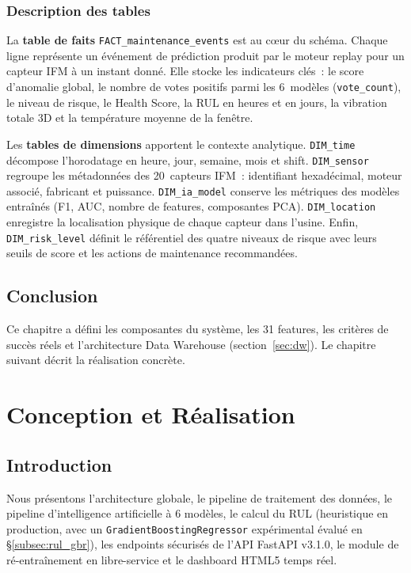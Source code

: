 \documentclass[12pt,a4paper]{report}
\begin{document}
\subsection{Description des tables}

La \textbf{table de faits} \texttt{FACT\_maintenance\_events} est au cœur
du schéma. Chaque ligne représente un événement de prédiction produit par
le moteur replay pour un capteur IFM à un instant donné. Elle stocke
les indicateurs clés~: le score d'anomalie global, le nombre de votes
positifs parmi les 6~modèles (\texttt{vote\_count}), le niveau de risque,
le Health Score, la RUL en heures et en jours, la vibration totale 3D
et la température moyenne de la fenêtre.

Les \textbf{tables de dimensions} apportent le contexte analytique.
\texttt{DIM\_time} décompose l'horodatage en heure, jour, semaine,
mois et shift. \texttt{DIM\_sensor} regroupe les métadonnées des
20~capteurs IFM~: identifiant hexadécimal, moteur associé, fabricant
et puissance. \texttt{DIM\_ia\_model} conserve les métriques des modèles
entraînés (F1, AUC, nombre de features, composantes PCA).
\texttt{DIM\_location} enregistre la localisation physique de chaque
capteur dans l'usine. Enfin, \texttt{DIM\_risk\_level} définit le
référentiel des quatre niveaux de risque avec leurs seuils de score et
les actions de maintenance recommandées.

\section{Conclusion}

Ce chapitre a défini les composantes du système, les 31 features, les critères de succès réels et l'architecture Data Warehouse (section~\ref{sec:dw}). Le chapitre suivant décrit la réalisation concrète.

\chapter{Conception et Réalisation}

\section{Introduction}

Nous présentons l'architecture globale, le pipeline de traitement des données, le
pipeline d'intelligence artificielle à 6 modèles, le calcul du RUL (heuristique en
production, avec un \texttt{GradientBoostingRegressor} expérimental évalué en
\S\ref{subsec:rul_gbr}), les endpoints sécurisés de l'API FastAPI v3.1.0, le module de
ré-entraînement en libre-service et le dashboard HTML5 temps réel.
\end{document}
